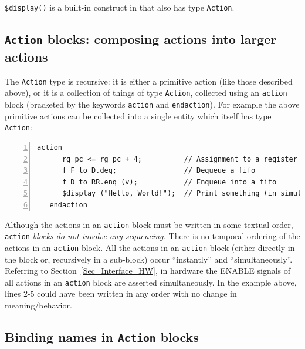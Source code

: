 
\verb|$display()| is a built-in construct in {\BSV} that also has type
\verb|Action|.


\subsection{{\tt Action} blocks: composing actions into larger actions}


The \verb|Action| type is recursive: it is either a primitive action
(like those described above), or it is a collection of things of type
\verb|Action|, collected using an \verb|action| block (bracketed by
the {\BSV} keywords \verb|action| and \verb|endaction|).  For example the
above primitive actions can be collected into a single entity which
itself has type \verb|Action|:

{\footnotesize
\begin{Verbatim}[frame=single, numbers=left]
   action
      rg_pc <= rg_pc + 4;          // Assignment to a register
      f_F_to_D.deq;                // Dequeue a fifo
      f_D_to_RR.enq (v);           // Enqueue into a fifo
      $display ("Hello, World!");  // Print something (in simulation only)
   endaction
\end{Verbatim}
}

Although the actions in an \verb|action| block must be written in some
textual order, \verb|action| \emph{blocks do not involve any
sequencing.}  There is no temporal ordering of the actions in an
\verb|action| block.  All the actions in an \verb|action| block
(either directly in the block or, recursively in a sub-block) occur
``instantly'' and ``simultaneously''.  Referring to
Section~\ref{Sec_Interface_HW}, in hardware the ENABLE signals of all
actions in an \verb|action| block are asserted simultaneously.  In the
example above, lines 2-5 could have been written in any order with no
change in meaning/behavior.


\subsection{Binding names in {\tt Action} blocks}

